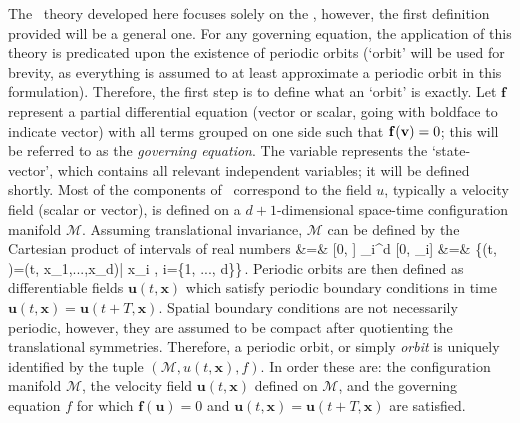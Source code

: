 The \spt\ theory developed here focuses solely on the \KSe, however, the first definition
provided will be a general one. For any governing equation, the application of this theory is
predicated upon the existence of periodic orbits (`orbit' will be
used for brevity, as everything is assumed to at least approximate a periodic orbit in this formulation).
Therefore, the first step is to define what an `orbit' is exactly. Let $\mathbf{f}$ represent a partial differential
equation (vector or scalar, going with boldface to indicate vector) with all terms
grouped on one side such that $\mathbf{f}(\mathbf{v})=0$; this will
be referred to as the \textit{governing equation}. The variable \statev represents the `state-vector',
which contains all relevant independent variables; it will be defined shortly. Most of the components of \statev\ correspond
to the field $u$, typically a velocity field (scalar or vector), is defined on a $d+1$-dimensional space-time configuration manifold $\mathcal{M}$.
Assuming translational invariance, $\mathcal{M}$ can be defined by the Cartesian product of intervals of real numbers
\bea
{} &=& [0, \period{}] \times \prod_{i}^{d} [0, \speriod{}_i] \continue
            &=& \{(t, )=(t, x_1,...,x_d)\:|\: x_i \in [0, L_i],\: \forall i=\{1, ..., d\}\}\,.
\eea
Periodic orbits are then defined as differentiable fields $\mathbf{u}(t, \mathbf{x})$ which satisfy
periodic boundary conditions in time $\mathbf{u}(t, \mathbf{x}) = \mathbf{u}(t+T, \mathbf{x})$.
Spatial boundary conditions are not necessarily periodic, however, they are assumed to be compact after
quotienting the translational symmetries.
Therefore, a periodic orbit, or simply \textit{orbit} is
uniquely identified by the tuple $(\mathcal{M}, u(t, \mathbf{x}), f)$. In order these are: the configuration manifold $\mathcal{M}$,
the velocity field $\mathbf{u}(t, \mathbf{x})$ defined on $\mathcal{M}$, and the governing equation $f$ for which
$\mathbf{f}(\mathbf{u})=0$ and $\mathbf{u}(t, \mathbf{x}) = \mathbf{u}(t+T, \mathbf{x})$ are satisfied.

